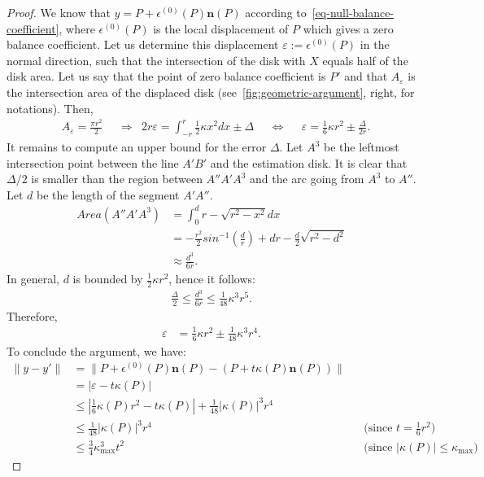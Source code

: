 \documentclass[review]{siamart220329}
\begin{document}
\begin{proof}
  We know that $y = P + \epsilon^{(0)}(P)\mathbf{n}(P)$ according
  to~\cref{eq-null-balance-coefficient}, where $\epsilon^{(0)}(P)$ is
  the local displacement of $P$ which gives a zero balance
  coefficient. Let us determine this displacement $\varepsilon :=
  \epsilon^{(0)}(P)$ in the normal direction, such that the
  intersection of the disk with $X$ equals half of the disk area. Let
  us say that the point of zero balance coefficient is $P'$ and that
  $A_{\varepsilon}$ is the intersection area of the displaced disk
  (see~\cref{fig:geometric-argument}, right, for
  notations).  Then,
%
%
\begin{align*}
	 & A_{\varepsilon} = \frac{\pi r ^2}{2} 
	 && \Rightarrow & 2r\varepsilon = \int_{-r}^{r}{\frac{1}{2}\kappa x^2dx} \pm \Delta 
	&& \Leftrightarrow & & \varepsilon = \frac{1}{6}\kappa r^2 \pm \frac{\Delta}{2r}.
\end{align*}
%
%
It remains to compute an upper bound for the error $\Delta$. Let $A^3$ be the leftmost intersection point between the line $A'B'$ and the estimation disk. It is clear that $\Delta/2$ is smaller than the region between $A''A'A^3$ and the arc going from $A^3$ to $A''$. Let $d$ be the length of the segment $A'A''$. 
%
%
\begin{align*}
	Area(A''A'A^3) &= \int_0^d{r - \sqrt{r^2 - x^2} dx} \\
				   &= -\frac{r^2}{2}sin^{-1}\left(\frac{d}{r}\right) + dr - \frac{d}{2}\sqrt{r^2-d^2} \\
				   &\approx \frac{d^3}{6r}.
\end{align*}
%
%
In general, $d$ is bounded by $\frac{1}{2}\kappa r^2$, hence it follows:
%
%
\begin{align*}
	\frac{\Delta}{2} \leq \frac{d^3}{6r} \leq \frac{1}{48}\kappa^3r^5.
\end{align*}
%
%
Therefore,
%
%
\begin{align*}
	\varepsilon &= \frac{1}{6}\kappa r^2 \pm \frac{1}{48}\kappa^3r^4.
\end{align*}
%
%
To conclude the argument, we have:
\begin{align*}
  \| y - y' \| & = \| P + \epsilon^{(0)}(P)\mathbf{n}(P) - (P+t\kappa(P)\mathbf{n}(P)) \| \\
  & = | \varepsilon - t \kappa(P) | \\
  & \le \left| \frac{1}{6}\kappa(P) r^2 - t\kappa(P) \right| + \frac{1}{48}|\kappa(P)|^3r^4\\
  & \le \frac{1}{48}|\kappa(P)|^3r^4 && \text{(since $t=\frac{1}{6}r^2$)} \\
  & \le \frac{3}{4}\kappa_{\max}^3 t^2 && \text{(since $|\kappa(P)| \le \kappa_{\max}$)}
\end{align*}
\end{proof}
\end{document}

